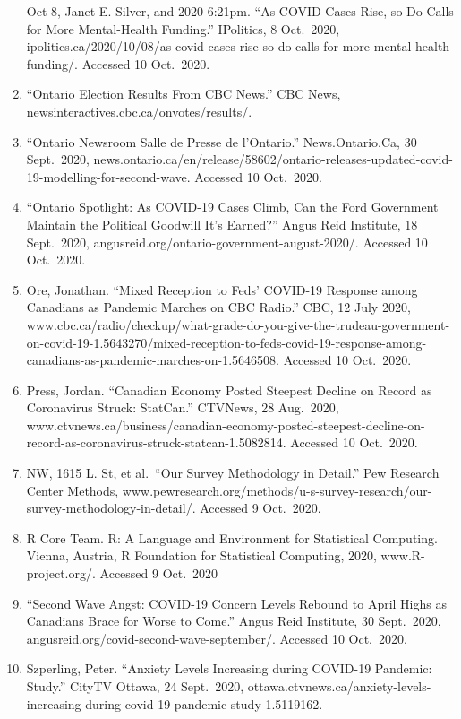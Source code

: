 \documentclass[
]{article}
\begin{document}
\begin{enumerate}
  Oct 8, Janet E. Silver, and 2020 6:21pm. ``As COVID Cases Rise, so Do
  Calls for More Mental-Health Funding.'' IPolitics, 8 Oct.~2020,
  ipolitics.ca/2020/10/08/as-covid-cases-rise-so-do-calls-for-more-mental-health-funding/.
  Accessed 10 Oct.~2020.
\item
  ``Ontario Election Results From CBC News.'' CBC News,
  newsinteractives.cbc.ca/onvotes/results/.
\item
  ``Ontario Newsroom \textbar{} Salle de Presse de l'Ontario.''
  News.Ontario.Ca, 30 Sept.~2020,
  news.ontario.ca/en/release/58602/ontario-releases-updated-covid-19-modelling-for-second-wave.
  Accessed 10 Oct.~2020.
\item
  ``Ontario Spotlight: As COVID-19 Cases Climb, Can the Ford Government
  Maintain the Political Goodwill It's Earned?'' Angus Reid Institute,
  18 Sept.~2020, angusreid.org/ontario-government-august-2020/. Accessed
  10 Oct.~2020.
\item
  Ore, Jonathan. ``Mixed Reception to Feds' COVID-19 Response among
  Canadians as Pandemic Marches on \textbar{} CBC Radio.'' CBC, 12 July
  2020,
  www.cbc.ca/radio/checkup/what-grade-do-you-give-the-trudeau-government-on-covid-19-1.5643270/mixed-reception-to-feds-covid-19-response-among-canadians-as-pandemic-marches-on-1.5646508.
  Accessed 10 Oct.~2020.
\item
  Press, Jordan. ``Canadian Economy Posted Steepest Decline on Record as
  Coronavirus Struck: StatCan.'' CTVNews, 28 Aug.~2020,
  www.ctvnews.ca/business/canadian-economy-posted-steepest-decline-on-record-as-coronavirus-struck-statcan-1.5082814.
  Accessed 10 Oct.~2020.
\item
  NW, 1615 L. St, et al.~``Our Survey Methodology in Detail.'' Pew
  Research Center Methods,
  www.pewresearch.org/methods/u-s-survey-research/our-survey-methodology-in-detail/.
  Accessed 9 Oct.~2020.
\item
  R Core Team. R: A Language and Environment for Statistical Computing.
  Vienna, Austria, R Foundation for Statistical Computing, 2020,
  www.R-project.org/. Accessed 9 Oct.~2020
\item
  ``Second Wave Angst: COVID-19 Concern Levels Rebound to April Highs as
  Canadians Brace for Worse to Come.'' Angus Reid Institute, 30
  Sept.~2020, angusreid.org/covid-second-wave-september/. Accessed 10
  Oct.~2020.
\item
  Szperling, Peter. ``Anxiety Levels Increasing during COVID-19
  Pandemic: Study.'' CityTV Ottawa, 24 Sept.~2020,
  ottawa.ctvnews.ca/anxiety-levels-increasing-during-covid-19-pandemic-study-1.5119162.

\end{enumerate}
\end{document}
